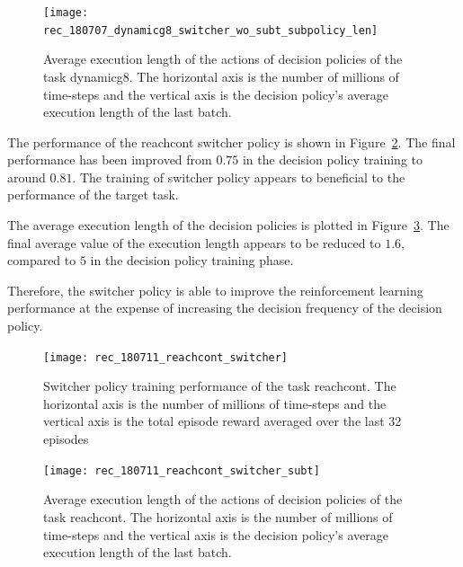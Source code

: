 \begin{figure}[!htbp]
	\centering
	\texttt{[image: rec\_180707\_dynamicg8\_switcher\_wo\_subt\_subpolicy\_len]}
	\caption{Average execution length of the actions of decision policies of the task dynamicg8. The horizontal axis is the number of millions of time-steps and the vertical axis is the decision policy's average execution length of the last batch.}
	\label{fig:rec_dynamicg8_avesubt}
\end{figure}

The performance of the reachcont switcher policy is shown in Figure~\ref{fig:rec_reachcont_switcher}. The final performance has been improved from $0.75$ in the decision policy training to around $0.81$. The training of switcher policy appears to beneficial to the performance of the target task.

The average execution length of the decision policies is plotted in Figure~\ref{fig:rec_reachcont_switcher_subt}. The final average value of the execution length appears to be reduced to $1.6$, compared to $5$ in the decision policy training phase.

Therefore, the switcher policy is able to improve the reinforcement learning performance at the expense of increasing the decision frequency of the decision policy.

\begin{figure}[!htbp]
	\centering
	\texttt{[image: rec\_180711\_reachcont\_switcher]}
	\caption{Switcher policy training performance of the task reachcont. The horizontal axis is the number of millions of time-steps and the vertical axis is the total episode reward averaged over the last 32 episodes}
	\label{fig:rec_reachcont_switcher}
\end{figure}
\begin{figure}[!htbp]
	\centering
	\texttt{[image: rec\_180711\_reachcont\_switcher\_subt]}
	\caption{Average execution length of the actions of decision policies of the task reachcont. The horizontal axis is the number of millions of time-steps and the vertical axis is the decision policy's average execution length of the last batch.}
	\label{fig:rec_reachcont_switcher_subt}
\end{figure}

